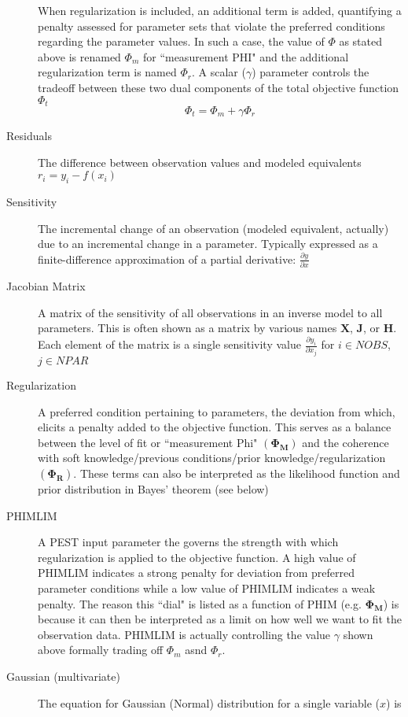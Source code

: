 \documentclass[english]{article}
\begin{document}
\begin{description}
When regularization is included, an additional term is added, quantifying a penalty assessed for parameter sets that violate the preferred conditions regarding the parameter values. In such a case, the value of $\Phi$ as stated above is renamed $\Phi_m$ for ``measurement PHI" and the additional regularization term is named $\Phi_r$. A scalar ($\gamma$) parameter controls the tradeoff between these two dual components of the total objective function $\Phi_t$
\begin{equation}
\Phi_t = \Phi_m + \gamma \Phi_r
\end{equation}

\item [Residuals] The difference between observation values and modeled equivalents $r_i=y_i-f\left(x_i\right)$
\item [Sensitivity] The incremental change of an observation (modeled equivalent, actually) due to an incremental change in a parameter. Typically expressed as a finite-difference approximation of a partial derivative: $\frac{\partial y}{\partial x}$
\item [Jacobian Matrix] A matrix of the sensitivity of all observations in an inverse model to all parameters. This is often shown as a matrix by various names $\mathbf{X}$, $\mathbf{J}$, or $\mathbf{H}$. Each element of the matrix is a single sensitivity value  $\frac{\partial y_i}{\partial x_j}$ for $i\in NOBS$, $j \in NPAR$
\item [Regularization] A preferred condition pertaining to parameters, the deviation from which, elicits a penalty added to the objective function. This serves as a balance between the level of fit or ``measurement Phi"  $(\mathbf{\Phi_M})$ and the coherence with soft knowledge/previous conditions/prior knowledge/regularization $(\mathbf{\Phi_R})$. These terms can also be interpreted as the likelihood function and prior distribution in Bayes' theorem (see below) 
\item [PHIMLIM] A PEST input parameter the governs the strength with which regularization is applied to the objective function. A high value of PHIMLIM indicates a strong penalty for deviation from preferred parameter conditions while a low value of PHIMLIM indicates a weak penalty. The reason this ``dial" is listed as a function of PHIM (e.g. $\mathbf{\Phi_M}$) is because it can then be interpreted as a limit on how well we want to fit the observation data. PHIMLIM is actually controlling the value $\gamma$ shown above formally trading off $\Phi_m$ asnd $\Phi_r$.
\item [Gaussian (multivariate)] The equation for Gaussian (Normal) distribution for a single variable ($x$) is 

\end{description}
\end{document}
